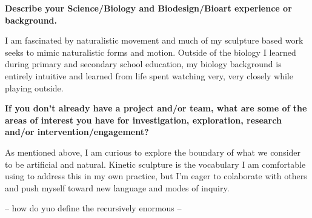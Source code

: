 \documentclass[11pt]{report}
\begin{document}
\textbf{Describe your Science/Biology and Biodesign/Bioart experience or background.}

I am fascinated by naturalistic movement and much of my sculpture based work seeks to mimic naturalistic forms and motion. Outside of the biology I learned during primary and secondary school education, my biology background is entirely intuitive and learned from life spent watching very, very closely while playing outside.


\textbf{If you don’t already have a project and/or team, what are some of the areas of interest you have for investigation, exploration, research and/or intervention/engagement?}

As mentioned above, I am curious to explore the boundary of what we consider to be artificial and natural. Kinetic sculpture is the vocabulary I am comfortable using to address this in my own practice, but I'm eager to colaborate with others and push myself toward new language and modes of inquiry.  



-- how do yuo define the recursively enormous -- 
\end{document}
